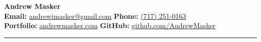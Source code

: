 \begin{center}
    {\LARGE \textbf{Andrew Masker}}\\[6pt]
    \textbf{Email:} \href{mailto:andrewimasker@gmail.com}{andrewimasker@gmail.com} \quad\textbar\quad
    \textbf{Phone:} \href{tel:+17172510163}{(717) 251-0163}\\[2pt]
    \textbf{Portfolio:} \href{https://andrewmasker.com}{andrewmasker.com} \quad\textbar\quad
    \textbf{GitHub:} \href{https://github.com/AndrewMasker}{github.com/AndrewMasker}
\end{center}
\vspace{-6pt}
\hrule
